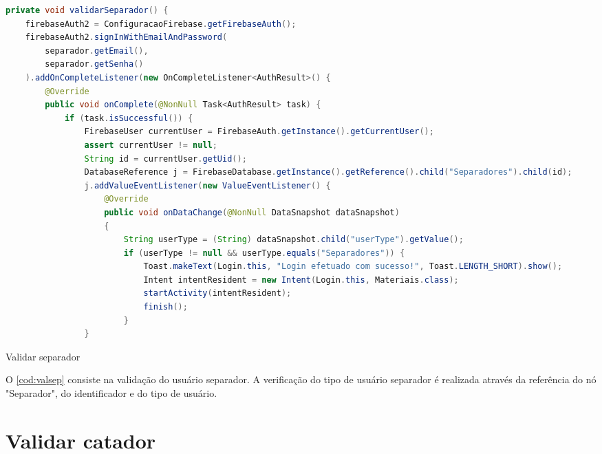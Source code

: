 \begin{codigo}[H]
	\begin{lstlisting}[language=Java]
private void validarSeparador() {
    firebaseAuth2 = ConfiguracaoFirebase.getFirebaseAuth();
    firebaseAuth2.signInWithEmailAndPassword(
        separador.getEmail(),
        separador.getSenha()
    ).addOnCompleteListener(new OnCompleteListener<AuthResult>() {
        @Override
        public void onComplete(@NonNull Task<AuthResult> task) {
            if (task.isSuccessful()) {
                FirebaseUser currentUser = FirebaseAuth.getInstance().getCurrentUser();
                assert currentUser != null;
                String id = currentUser.getUid();
                DatabaseReference j = FirebaseDatabase.getInstance().getReference().child("Separadores").child(id);
                j.addValueEventListener(new ValueEventListener() {
                    @Override
                    public void onDataChange(@NonNull DataSnapshot dataSnapshot)
                    {
                        String userType = (String) dataSnapshot.child("userType").getValue();
                        if (userType != null && userType.equals("Separadores")) {
                            Toast.makeText(Login.this, "Login efetuado com sucesso!", Toast.LENGTH_SHORT).show();
                            Intent intentResident = new Intent(Login.this, Materiais.class);
                            startActivity(intentResident);
                            finish();
                        }
                }
    	\end{lstlisting}
    	\caption{Validar separador}
    	\label{cod:valsep}
\end{codigo}

O \autoref{cod:valsep} consiste na validação do usuário separador. A verificação do tipo de usuário separador é realizada através da referência do nó "Separador", do identificador e do tipo de usuário.


\section{Validar catador}

